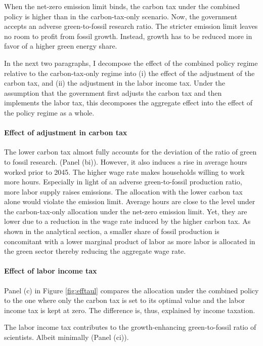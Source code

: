 When the net-zero emission limit binds, the carbon tax under the combined policy is higher than in the carbon-tax-only scenario.
Now, the government accepts an adverse green-to-fossil research ratio. The  stricter emission limit leaves no room to profit from fossil growth. Instead, growth has to be reduced more in favor of a higher green energy share. 

In the next two paragraphs, I decompose the effect of the combined policy regime relative to the carbon-tax-only regime into (i) the effect of the adjustment of the carbon tax, and (ii) the adjustment in the labor income tax. Under the assumption that the government first adjusts the carbon tax and then implements the labor tax, this decomposes the  aggregate effect into the effect of the policy regime as a whole.  

\paragraph{Effect of adjustment in carbon tax}
The lower carbon tax almost fully accounts for the deviation of the ratio of green to fossil research. (Panel (bi)). However, it also induces a rise in average hours worked prior to 2045. The higher wage rate makes households willing to work more hours. Especially in light of an adverse green-to-fossil production ratio, more labor supply raises emissions. The allocation with the lower carbon tax alone would violate the emission limit. 
Average hours are close to the level under the carbon-tax-only allocation under the net-zero emission limit. Yet, they are lower due to a reduction in the wage rate induced by the higher carbon tax. As shown in the analytical section, a smaller share of fossil production is concomitant with a lower marginal product of labor as more labor is allocated in the green sector thereby reducing the aggregate wage rate. 

\paragraph{Effect of labor income tax}

Panel (c) in Figure \ref{fig:efftaul} compares the allocation under the combined policy to the one where only the carbon tax is set to its optimal value and the labor income tax is kept at zero. The difference is, thus, explained by income taxation. 

The labor income tax contributes to the growth-enhancing green-to-fossil ratio of scientists. Albeit minimally (Panel (ci)). 

